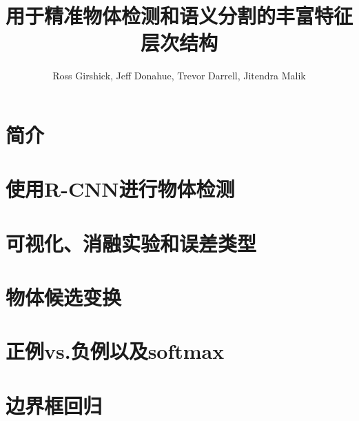 \documentclass{ctexart}
\title{用于精准物体检测和语义分割的丰富特征层次结构}
\author{Ross Girshick, Jeff Donahue, Trevor Darrell, Jitendra Malik}
\date{}
\begin{document}
\maketitle
\begin{abstract}
    
\end{abstract}
\section{简介}\label{sec:introduction}

\section{使用R-CNN进行物体检测}\label{sec:detection}

\section{可视化、消融实验和误差类型}\label{sec:understanding}

\appendix
\section{物体候选变换}\label{app:transformation}

\section{正例vs.负例以及softmax}\label{app:posi_neg}

\section{边界框回归}

\printbibliography
\end{document}
